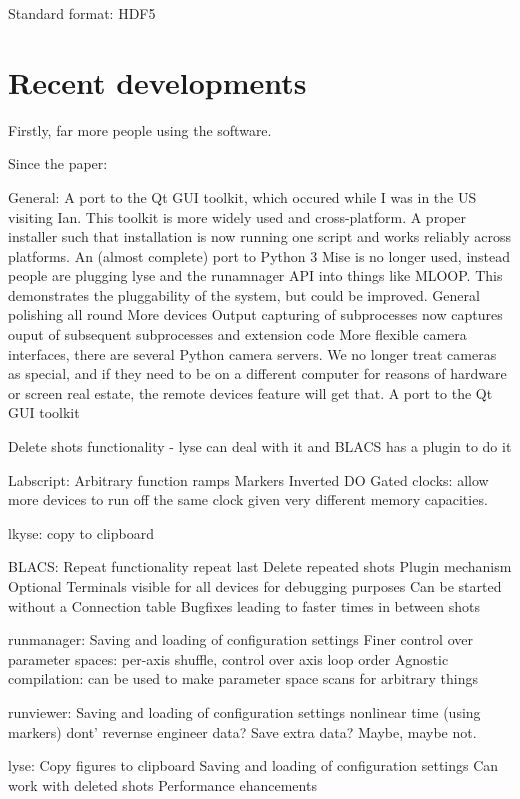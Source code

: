 Standard format: HDF5


\section{Recent developments}
Firstly, far more people using the software.

Since the paper:

General:
A port to the Qt GUI toolkit, which occured while I was in the US visiting Ian. This toolkit is more widely used and cross-platform.
A proper installer such that installation is now running one script and works reliably across platforms.
An (almost complete) port to Python 3
Mise is no longer used, instead people are plugging lyse and the runamnager API into things like MLOOP. This demonstrates the pluggability of the system, but could be improved.
General polishing all round
More devices
Output capturing of subprocesses now captures ouput of subsequent subprocesses and extension code
More flexible camera interfaces, there are several Python camera servers. We no longer treat cameras as special, and if they need to be on a different computer for reasons of hardware or screen real estate, the remote devices feature will get that.
A port to the Qt GUI toolkit

Delete shots functionality - lyse can deal with it and BLACS has a plugin to do it

Labscript:
Arbitrary function ramps
Markers
Inverted DO
Gated clocks: allow more devices to run off the same clock given very different memory capacities.

lkyse: copy to clipboard

BLACS:
Repeat functionality repeat last
Delete repeated shots
Plugin mechanism
Optional Terminals visible for all devices for debugging purposes
Can be started without a Connection table
Bugfixes leading to faster times in between shots

runmanager:
Saving and loading of configuration settings
Finer control over parameter spaces: per-axis shuffle, control over axis loop order
Agnostic compilation: can be used to make parameter space scans for arbitrary things

runviewer:
Saving and loading of configuration settings
nonlinear time (using markers)
dont' revernse engineer data? Save extra data? Maybe, maybe not.

lyse:
Copy figures to clipboard
Saving and loading of configuration settings
Can work with deleted shots
Performance ehancements

